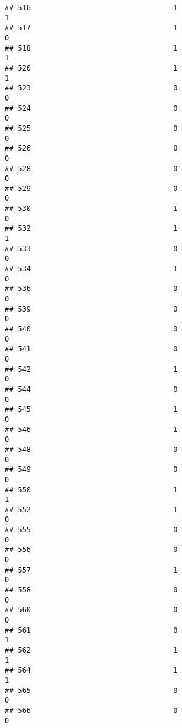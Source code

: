 \documentclass[
]{article}
\begin{document}
\begin{verbatim}
## 516                                 1                                1
## 517                                 1                                0
## 518                                 1                                1
## 520                                 1                                1
## 523                                 0                                0
## 524                                 0                                0
## 525                                 0                                0
## 526                                 0                                0
## 528                                 0                                0
## 529                                 0                                0
## 530                                 1                                0
## 532                                 1                                1
## 533                                 0                                0
## 534                                 1                                0
## 536                                 0                                0
## 539                                 0                                0
## 540                                 0                                0
## 541                                 0                                0
## 542                                 1                                0
## 544                                 0                                0
## 545                                 1                                0
## 546                                 1                                0
## 548                                 0                                0
## 549                                 0                                0
## 550                                 1                                1
## 552                                 1                                0
## 555                                 0                                0
## 556                                 0                                0
## 557                                 1                                0
## 558                                 0                                0
## 560                                 0                                0
## 561                                 0                                1
## 562                                 1                                1
## 564                                 1                                1
## 565                                 0                                0
## 566                                 0                                0

\end{verbatim}
\end{document}
